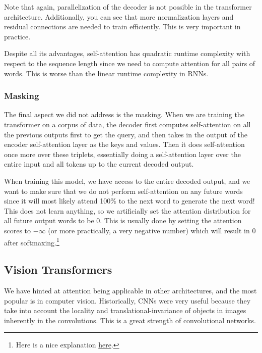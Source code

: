 \documentclass{article}
\begin{document}
      Note that again, parallelization of the decoder is not possible in the transformer architecture. Additionally, you can see that more normalization layers and residual connections are needed to train efficiently. This is very important in practice. 

      Despite all its advantages, self-attention has quadratic runtime complexity with respect to the sequence length since we need to compute attention for all pairs of words. This is worse than the linear runtime complexity in RNNs.  

    \subsubsection{Masking}

      The final aspect we did not address is the masking. When we are training the transformer on a corpus of data, the decoder first computes self-attention on all the previous outputs first to get the query, and then takes in the output of the encoder self-attention layer as the keys and values. Then it does self-attention once more over these triplets, essentially doing a self-attention layer over the entire input and all tokens up to the current decoded output. 

      When training this model, we have access to the entire decoded output, and we want to make sure that we do not perform self-attention on any future words since it will most likely attend 100\% to the next word to generate the next word! This does not learn anything, so we artificially set the attention distribution for all future output words to be $0$. This is usually done by setting the attention scores to $-\infty$ (or more practically, a very negative number) which will result in $0$ after softmaxing.\footnote{Here is a nice explanation \href{https://stackoverflow.com/questions/58127059/how-to-understand-masked-multi-head-attention-in-transformer}{here}.}

  \subsection{Vision Transformers} 

    We have hinted at attention being applicable in other architectures, and the most popular is in computer vision. Historically, CNNs were very useful because they take into account the locality and translational-invariance of objects in images inherently in the convolutions. This is a great strength of convolutional networks. 
    
\end{document}
